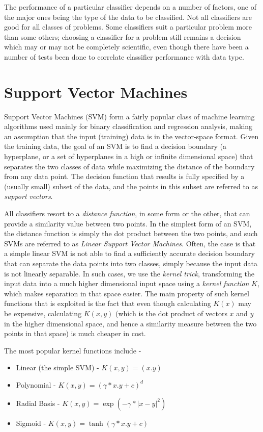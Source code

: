 The performance of a particular classifier depends on a number of factors, one of the major ones being the type of the data to be classified. Not all classifiers are good for all classes of problems. Some classifiers suit a particular problem more than some others; choosing a classifier for a problem still remains a decision which may or may not be completely scientific, even though there have been a number of tests been done to correlate classifier performance with data type.

\section{Support Vector Machines}
Support Vector Machines (SVM) form a fairly popular class of machine learning algorithms used mainly for binary classification and regression analysis, making an assumption that the input (training) data is in the vector-space format. Given the training data, the goal of an SVM is to find a decision boundary (a hyperplane, or a set of hyperplanes in a high or infinite dimensional space) that separates the two classes of data while maximizing the distance of the boundary from any data point. The decision function that results is fully specified by a (usually small) subset of the data, and the points in this subset are referred to as \emph{support vectors}.

All classifiers resort to a \emph{distance function}, in some form or the other, that can provide a similarity value between two points. In the simplest form of an SVM, the distance function is simply the dot product between the two points, and such SVMs are referred to as \emph{Linear Support Vector Machines}. Often, the case is that a simple linear SVM is not able to find a sufficiently accurate decision boundary that can separate the data points into two classes, simply because the input data is not linearly separable. In such cases, we use the \emph{kernel trick}, transforming the input data into a much higher dimensional input space using a \emph{kernel function} $K$, which makes separation in that space easier. The main property of such kernel functions that is exploited is the fact that even though calculating $K(x)$ may be expensive, calculating $K(x, y)$ (which is the dot product of vectors $x$ and $y$ in the higher dimensional space, and hence a similarity measure between the two points in that space) is much cheaper in cost.

The most popular kernel functions include -
\begin{itemize}
    \item{Linear (the simple SVM) - $K(x, y) = (x . y)$ }
    \item{Polynomial - $K(x, y) = (\gamma * x . y + c)^{d}$}
    \item{Radial Basis - $K(x, y) = \exp(-\gamma * {| x - y |}^{2})$}
    \item{Sigmoid - $K(x, y) = \tanh(\gamma * x . y + c)$}
\end{itemize}


